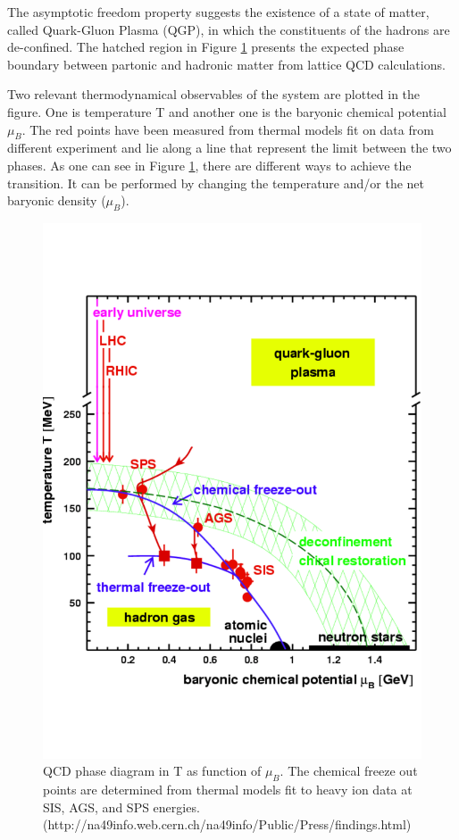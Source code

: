 The asymptotic freedom property suggests the existence of a state of matter, called Quark-Gluon Plasma (QGP), in which the constituents of the hadrons are de-confined. The hatched region in Figure \ref{fig:phase} presents the expected phase boundary between partonic and hadronic matter from lattice QCD calculations. 

Two relevant thermodynamical observables of the system are plotted in the figure. One is temperature T and another one is the baryonic chemical potential $\mu_{B}$. The red points have been measured from thermal models fit on data from different experiment \cite{cite:thermal_pbm} and lie along a line that represent the limit between the two phases. As one can see in Figure \ref{fig:phase}, there are different ways to achieve the transition. It can be performed by changing the temperature and/or the net baryonic density ($\mu_{B}$). 

\begin{figure}[htbp]
\begin{center}
\includegraphics[width=12.cm]{./Version1/FigChapter1/PhaseDiagram}
\caption{QCD phase diagram in T as function of $\mu_{B}$. The chemical freeze out points are determined from thermal models fit to heavy ion data at SIS, AGS, and SPS energies. (http://na49info.web.cern.ch/na49info/Public/Press/findings.html)}
\label{fig:phase}
\end{center}
\end{figure}


